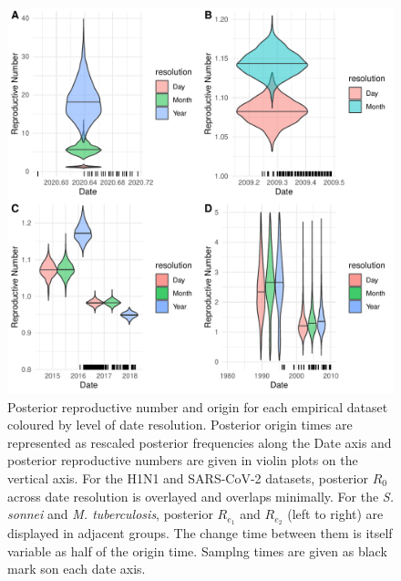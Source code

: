 \documentclass{article}
\begin{document}
\begin{spacing}{1.5}
\begin{figure}[h!]
    \centering
    \includegraphics{empirical_plot.pdf}
    \caption{Posterior reproductive number and origin for each empirical dataset coloured by level of date resolution. Posterior origin times are represented as rescaled posterior frequencies along the Date axis and posterior reproductive numbers are given in violin plots on the vertical axis. For the H1N1 and SARS-CoV-2 datasets, posterior $R_0$ across date resolution is overlayed and overlaps minimally. For the \textit{S. sonnei} and \textit{M. tuberculosis}, posterior $R_{e_1}$ and $R_{e_2}$ (left to right) are displayed in adjacent groups. The change time between them is itself variable as half of the origin time. Samplng times are given as black mark son each date axis.}
    \label{fig:empR}
\end{figure}


\end{spacing}
\end{document}
